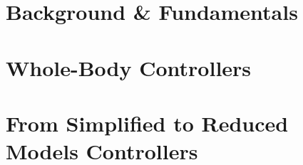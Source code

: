 \documentclass[a4paper,12pt,oneside,custombib,print,index]{Classes/PhDThesisPSnPDF}
\begin{document}


\frontmatter








\tableofcontents

\listoffigures

\listoftables


\printnomenclature



\mainmatter


\part{Background \& Fundamentals\label{part:background}}







\part{Whole-Body Controllers\label{part:wbc}}




\part{From Simplified to Reduced Models Controllers\label{part:simplified}}






\begin{spacing}{0.9}



\cleardoublepage





\end{spacing}


\begin{appendices} %







\end{appendices}

\printthesisindex %
\end{document}
